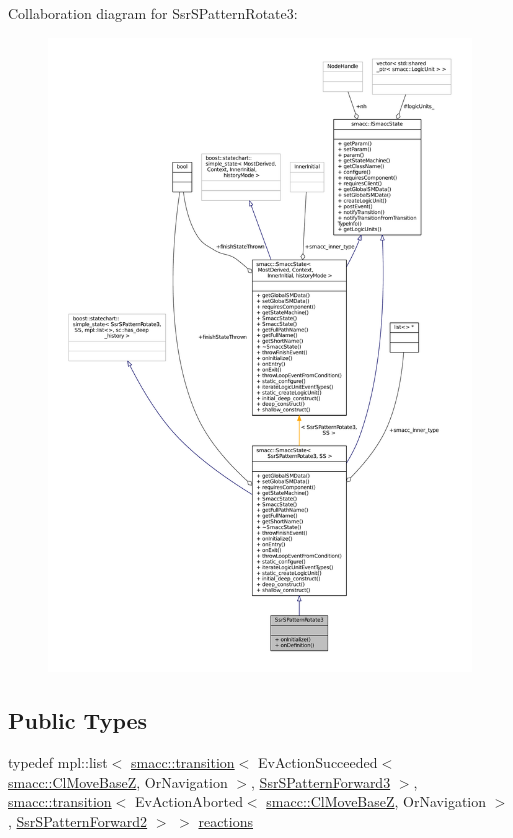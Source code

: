 Collaboration diagram for Ssr\+S\+Pattern\+Rotate3\+:
\nopagebreak
\begin{figure}[H]
\begin{center}
\leavevmode
\includegraphics[width=350pt]{structSsrSPatternRotate3__coll__graph}
\end{center}
\end{figure}
\subsection*{Public Types}
\begin{DoxyCompactItemize}
\item 
typedef mpl\+::list$<$ \hyperlink{classsmacc_1_1transition}{smacc\+::transition}$<$ Ev\+Action\+Succeeded$<$ \hyperlink{classsmacc_1_1ClMoveBaseZ}{smacc\+::\+Cl\+Move\+BaseZ}, Or\+Navigation $>$, \hyperlink{structSsrSPatternForward3}{Ssr\+S\+Pattern\+Forward3} $>$, \hyperlink{classsmacc_1_1transition}{smacc\+::transition}$<$ Ev\+Action\+Aborted$<$ \hyperlink{classsmacc_1_1ClMoveBaseZ}{smacc\+::\+Cl\+Move\+BaseZ}, Or\+Navigation $>$, \hyperlink{structSsrSPatternForward2}{Ssr\+S\+Pattern\+Forward2} $>$ $>$ \hyperlink{structSsrSPatternRotate3_a2a8df9f21e221d6dc03c8c2edc0ef8b3}{reactions}
\end{DoxyCompactItemize}

